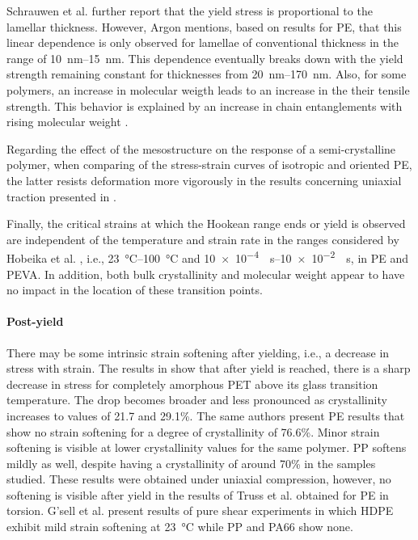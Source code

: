 Schrauwen et al. \citep{schrauwenIntrinsicDeformationBehavior2004} further report that the yield stress is proportional to the lamellar thickness.
However, Argon \citep{argonPhysicsDeformationFracture2013a} mentions, based on results for PE, that this linear dependence is only observed for lamellae of conventional thickness in the range of \SIrange{10}{15}{\nano\meter}.
This dependence eventually breaks down with the yield strength remaining constant for thicknesses from \SIrange{20}{170}{\nano\meter}.
Also, for some polymers, an increase in molecular weigth leads to an increase in the their tensile strength.
This behavior is explained by an increase in chain entanglements with rising molecular weight \citep{callister2014materials}.

Regarding the effect of the mesostructure on the response of a semi-crystalline polymer, when comparing of the stress-strain curves of isotropic and oriented PE, the latter resists deformation more vigorously in the results concerning uniaxial traction presented in \cite{naViscousForceDominatedTensileDeformation2006}.

Finally, the critical strains at which the Hookean range ends or yield is observed are independent of the temperature and strain rate in the ranges considered by Hobeika et al. \citep{hobeikaTemperatureStrainRate2000}, i.e., \SIrange{23}{100}{\celsius} and \SIrange{10e-4}{10e-2}{\per\second}, in PE and PEVA.
In addition, both bulk crystallinity and molecular weight appear to have no impact in the location of these transition points.

\paragraph{Post-yield}
There may be some intrinsic strain softening after yielding, i.e., a decrease in stress with strain.
The results in \cite{schrauwenIntrinsicDeformationBehavior2004} show that after yield is reached, there is a sharp decrease in stress for completely amorphous PET above its glass transition temperature.
The drop becomes broader and less pronounced as crystallinity increases to values of 21.7 and 29.1\%.
The same authors present PE results that show no strain softening for a degree of crystallinity of 76.6\%.
Minor strain softening is visible at lower crystallinity values for the same polymer.
PP softens mildly as well, despite having a crystallinity of around 70\% in the samples studied.
These results were obtained under uniaxial compression, however, no softening is visible after yield in the results of Truss et al. \cite{trussEffectHydrostaticPressure1981} obtained for PE in torsion.
G'sell et al. \citep{gsellApplicationPlaneSimple1983} present results of pure shear experiments in which HDPE exhibit mild strain softening at \SI{23}{\celsius} while PP and PA66 show none.

